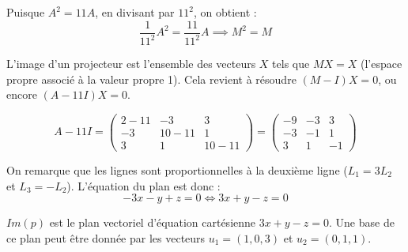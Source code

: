 \documentclass[french]{yLectureNote}
\begin{document}
Puisque $A^2 = 11A$, en divisant par $11^2$, on obtient :
$$\frac{1}{11^2} A^2 = \frac{11}{11^2} A \implies M^2 = M$$



L'image d'un projecteur est l'ensemble des vecteurs $X$ tels que $MX = X$ (l'espace propre associé à la valeur propre 1).
Cela revient à résoudre $(M - I)X = 0$, ou encore $(A - 11I)X = 0$.

$$A - 11I = \begin{pmatrix} 2-11 & -3 & 3 \\ -3 & 10-11 & 1 \\ 3 & 1 & 10-11 \end{pmatrix} = \begin{pmatrix} -9 & -3 & 3 \\ -3 & -1 & 1 \\ 3 & 1 & -1 \end{pmatrix}$$

On remarque que les lignes sont proportionnelles à la deuxième ligne ($L_1 = 3L_2$ et $L_3 = -L_2$). L'équation du plan est donc :
$$-3x - y + z = 0 \iff 3x + y - z = 0$$


$Im(p)$ est le plan vectoriel d'équation cartésienne $3x + y - z = 0$. 
Une base de ce plan peut être donnée par les vecteurs $u_1 = (1, 0, 3)$ et $u_2 = (0, 1, 1)$.


\end{document}
